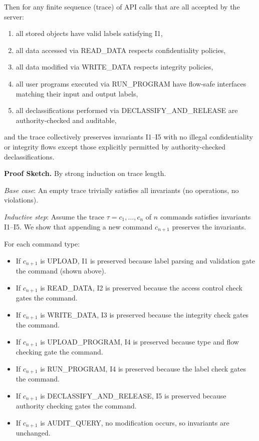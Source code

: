 Then for any finite sequence (trace) of API calls that are all accepted by the server:
\begin{enumerate}
    \item all stored objects have valid labels satisfying I1,
    \item all data accessed via READ\_DATA respects confidentiality policies,
    \item all data modified via WRITE\_DATA respects integrity policies,
    \item all user programs executed via RUN\_PROGRAM have flow-safe interfaces matching their input and output labels,
    \item all declassifications performed via DECLASSIFY\_AND\_RELEASE are authority-checked and auditable,
\end{enumerate}

and the trace collectively preserves invariants I1--I5 with no illegal confidentiality or integrity flows except those explicitly permitted by authority-checked declassifications.

\textbf{Proof Sketch.}
By strong induction on trace length. 

\emph{Base case}: An empty trace trivially satisfies all invariants (no operations, no violations).

\emph{Inductive step}: Assume the trace $\tau = c_1, \ldots, c_n$ of $n$ commands satisfies invariants I1--I5. We show that appending a new command $c_{n+1}$ preserves the invariants.

For each command type:
\begin{itemize}
    \item If $c_{n+1}$ is UPLOAD, I1 is preserved because label parsing and validation gate the command (shown above).
    \item If $c_{n+1}$ is READ\_DATA, I2 is preserved because the access control check gates the command.
    \item If $c_{n+1}$ is WRITE\_DATA, I3 is preserved because the integrity check gates the command.
    \item If $c_{n+1}$ is UPLOAD\_PROGRAM, I4 is preserved because type and flow checking gate the command.
    \item If $c_{n+1}$ is RUN\_PROGRAM, I4 is preserved because the label check gates the command.
    \item If $c_{n+1}$ is DECLASSIFY\_AND\_RELEASE, I5 is preserved because authority checking gates the command.
    \item If $c_{n+1}$ is AUDIT\_QUERY, no modification occurs, so invariants are unchanged.
\end{itemize}

